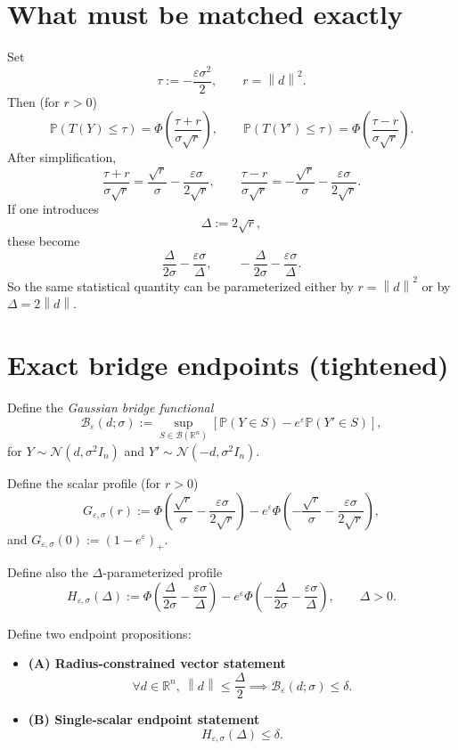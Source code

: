 \documentclass[11pt]{article}
\newcommand{\R}{\mathbb{R}}
\newcommand{\Pbb}{\mathbb{P}}
\newcommand{\N}{\mathcal{N}}
\newcommand{\norm}[1]{\left\lVert #1\right\rVert}
\newcommand{\PhiStd}{\Phi}
\newcommand{\Beps}{\mathcal{B}_\varepsilon}
\begin{document}
\section{What must be matched exactly}
Set
\[
\tau:=-\frac{\varepsilon\sigma^2}{2},
\qquad r=\norm{d}^2.
\]
Then (for $r>0$)
\[
\Pbb(T(Y)\le\tau)=
\PhiStd\!\left(\frac{\tau+r}{\sigma\sqrt r}\right),
\qquad
\Pbb(T(Y')\le\tau)=
\PhiStd\!\left(\frac{\tau-r}{\sigma\sqrt r}\right).
\]
After simplification,
\[
\frac{\tau+r}{\sigma\sqrt r}=\frac{\sqrt r}{\sigma}-\frac{\varepsilon\sigma}{2\sqrt r},
\qquad
\frac{\tau-r}{\sigma\sqrt r}=-\frac{\sqrt r}{\sigma}-\frac{\varepsilon\sigma}{2\sqrt r}.
\]
If one introduces
\[
\Delta:=2\sqrt r,
\]
these become
\[
\frac{\Delta}{2\sigma}-\frac{\varepsilon\sigma}{\Delta},
\qquad
-\frac{\Delta}{2\sigma}-\frac{\varepsilon\sigma}{\Delta}.
\]
So the same statistical quantity can be parameterized either by $r=\norm d^2$ or by $\Delta=2\norm d$.

\section{Exact bridge endpoints (tightened)}
Define the \emph{Gaussian bridge functional}
\[
\Beps(d;\sigma)
:=
\sup_{S\in\mathcal B(\R^n)}
\left[\Pbb(Y\in S)-e^\varepsilon \Pbb(Y'\in S)\right],
\]
for $Y\sim\N(d,\sigma^2I_n)$ and $Y'\sim\N(-d,\sigma^2I_n)$.

Define the scalar profile (for $r>0$)
\[
G_{\varepsilon,\sigma}(r)
:=
\PhiStd\!\left(\frac{\sqrt r}{\sigma}-\frac{\varepsilon\sigma}{2\sqrt r}\right)
-e^\varepsilon
\PhiStd\!\left(-\frac{\sqrt r}{\sigma}-\frac{\varepsilon\sigma}{2\sqrt r}\right),
\]
and $G_{\varepsilon,\sigma}(0):=(1-e^\varepsilon)_+$.

Define also the $\Delta$-parameterized profile
\[
H_{\varepsilon,\sigma}(\Delta)
:=
\PhiStd\!\left(\frac{\Delta}{2\sigma}-\frac{\varepsilon\sigma}{\Delta}\right)
-e^\varepsilon
\PhiStd\!\left(-\frac{\Delta}{2\sigma}-\frac{\varepsilon\sigma}{\Delta}\right),
\qquad \Delta>0.
\]

Define two endpoint propositions:
\begin{itemize}
\item \textbf{(A) Radius-constrained vector statement}
\[
\forall d\in\R^n,\ \norm d\le \frac{\Delta}{2}
\implies
\Beps(d;\sigma)\le \delta.
\]
\item \textbf{(B) Single-scalar endpoint statement}
\[
H_{\varepsilon,\sigma}(\Delta)\le \delta.
\]
\end{itemize}
\end{document}
